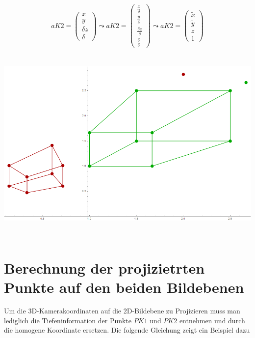 \begin{gather}
aK2 = 
\begin{pmatrix}
x\\y\\\delta z\\\delta
\end{pmatrix}
\leadsto aK2= 
\begin{pmatrix}
\frac{x}{\delta}\\ \frac{y}{\delta}\\ \frac{\delta z}{\delta}\\ \frac{\delta}{\delta}
\end{pmatrix}
\leadsto aK2 =
\begin{pmatrix}
\tilde{x}\\
\tilde{y}\\
z\\
1
\end{pmatrix}
\end{gather}\\

\begin{minipage}{\linewidth}
	\centering
	\includegraphics[width=0.8\linewidth]{images/Camer1and2Objects.png}
\end{minipage}\\
\section{Berechnung der projizietrten Punkte auf den beiden Bildebenen}

Um die 3D-Kamerakoordinaten auf die 2D-Bildebene zu Projizieren muss man lediglich die Tiefeninformation der Punkte \ensuremath{PK1} und \ensuremath{PK2} entnehmen und durch die homogene Koordinate ersetzen. Die folgende Gleichung zeigt ein Beispiel dazu 

